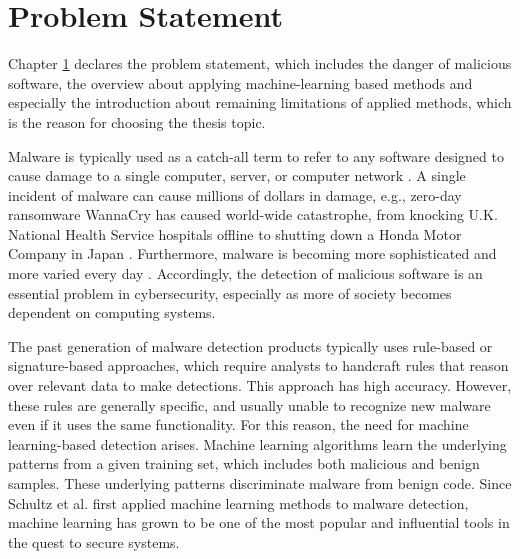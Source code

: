 
\chapter{Problem Statement}
\label{chap:problem-statement}
\graphicspath{{Chapter1/Figs/}}

\begin{chapabstract}
Chapter \ref{chap:problem-statement} declares the problem statement, which includes the danger of malicious software, the overview about applying machine-learning based methods and especially the introduction about remaining limitations of applied methods, which is the reason for choosing the thesis topic.
\end{chapabstract}
 
 Malware is typically used as a catch-all term to refer to any software designed to cause damage to a single computer, server, or computer network \cite{moir2003defining}.
 A single incident of malware can cause millions of dollars in damage, e.g., zero-day ransomware WannaCry has caused world-wide catastrophe, from knocking U.K. National Health Service hospitals offline to shutting down a Honda Motor Company in Japan \cite{chen2017automated}.
 Furthermore, malware is becoming more sophisticated and more varied every day  \cite{shahi2009technology}.
Accordingly, the detection of malicious software is an essential problem in cybersecurity, especially as more of society becomes dependent on computing systems.

The past generation of malware detection products typically uses rule-based or signature-based approaches, which require analysts to handcraft rules that reason over relevant data to make detections. This approach has high accuracy. However, these rules are generally specific, and usually unable to recognize new malware even if it uses the same functionality. For this reason, the need for machine learning-based detection arises. Machine learning algorithms learn the underlying patterns from a given training set, which includes both malicious and benign samples. These underlying patterns discriminate malware from benign code. Since Schultz et al. \cite{schultz2001data} first applied machine learning methods to malware detection, machine learning has grown to be one of the most popular and influential tools in the quest to secure systems. 

